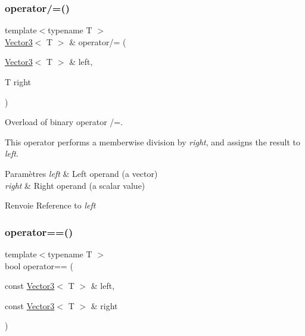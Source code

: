 \subsubsection{\texorpdfstring{operator/=()}{operator/=()}}
{\footnotesize\ttfamily template$<$typename T $>$ \\
\hyperlink{classsf_1_1Vector3}{Vector3}$<$ T $>$ \& operator/= (\begin{DoxyParamCaption}\item[{\hyperlink{classsf_1_1Vector3}{Vector3}$<$ T $>$ \&}]{left,  }\item[{T}]{right }\end{DoxyParamCaption})\hspace{0.3cm}{\ttfamily [related]}}



Overload of binary operator /=. 

This operator performs a memberwise division by {\itshape right}, and assigns the result to {\itshape left}.


\begin{DoxyParams}{Paramètres}
{\em left} & Left operand (a vector) \\
\hline
{\em right} & Right operand (a scalar value)\\
\hline
\end{DoxyParams}
\begin{DoxyReturn}{Renvoie}
Reference to {\itshape left} 
\end{DoxyReturn}
\mbox{\label{classsf_1_1Vector3_a388d72db973306a35ba467016b3dee30}} 
\subsubsection{\texorpdfstring{operator==()}{operator==()}}
{\footnotesize\ttfamily template$<$typename T $>$ \\
bool operator== (\begin{DoxyParamCaption}\item[{const \hyperlink{classsf_1_1Vector3}{Vector3}$<$ T $>$ \&}]{left,  }\item[{const \hyperlink{classsf_1_1Vector3}{Vector3}$<$ T $>$ \&}]{right }\end{DoxyParamCaption})\hspace{0.3cm}{\ttfamily [related]}}




